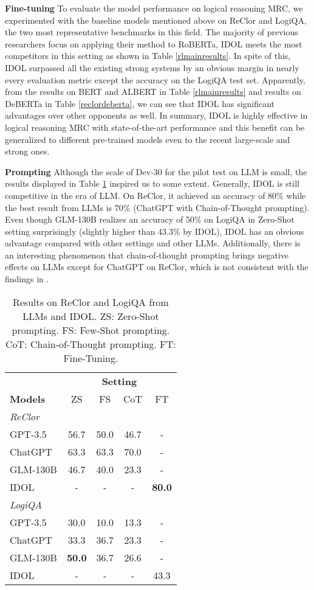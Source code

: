\documentclass[11pt]{article}
\begin{document}
\textbf{Fine-tuning} To evaluate the model performance on logical reasoning MRC, we experimented with the baseline models mentioned above on ReClor and LogiQA, the two most representative benchmarks in this field. The majority of previous researchers focus on applying their method to RoBERTa, IDOL meets the most competitors in this setting as shown in Table \ref{rlmainresults}. In spite of this, IDOL surpassed all the existing strong systems by an obvious margin in nearly every evaluation metric except the accuracy on the LogiQA test set. Apparently, from the results on BERT and ALBERT in Table \ref{rlmainresults} and results on DeBERTa in Table \ref{reclordeberta}, we can see that IDOL has significant advantages over other opponents as well. In summary, IDOL is highly effective in logical reasoning MRC with state-of-the-art performance and this benefit can be generalized to different pre-trained models even to the recent large-scale and strong ones.

\textbf{Prompting} Although the scale of Dev-30 for the pilot test on LLM is small, the results displayed in Table \ref{llmresults} inspired us to some extent. Generally, IDOL is still competitive in the era of LLM. On ReClor, it achieved an accuracy of 80\% while the best result from LLMs is 70\% (ChatGPT with Chain-of-Thought prompting). Even though GLM-130B realizes an accuracy of 50\% on LogiQA in Zero-Shot setting surprisingly (slightly higher than 43.3\% by IDOL), IDOL has an obvious advantage compared with other settings and other LLMs. Additionally, there is an interesting phenomenon that chain-of-thought prompting brings negative effects on LLMs except for ChatGPT on ReClor, which is not consistent with the findings in \citet{cot}.


\begin{table}[t]
\centering
\begin{tabular}{lcccc}
\toprule
 & \multicolumn{4}{c}{\textbf{Setting}} \\
\textbf{Models} & ZS & FS & CoT & FT \\ \midrule

\small\textit{{ReClor}} & & & & \\ 
GPT-3.5 & 56.7 & 50.0 & 46.7 & - \\
ChatGPT  & 63.3 & 63.3 & 70.0 & - \\
GLM-130B & 46.7 & 40.0 & 23.3 & - \\
IDOL & - & - & - & \textbf{80.0} \\  \midrule 

\small\textit{{LogiQA}} & & & & \\ 
GPT-3.5 & 30.0 & 10.0 & 13.3 & - \\
ChatGPT & 33.3 & 36.7 & 23.3 & - \\
GLM-130B & \textbf{50.0} & 36.7 & 26.6 & - \\
IDOL & - & - & - & 43.3 \\ 

\bottomrule
\end{tabular}
\caption{\label{llmresults}Results on ReClor and LogiQA from LLMs and IDOL. ZS: Zero-Shot prompting. FS: Few-Shot prompting. CoT: Chain-of-Thought prompting. FT: Fine-Tuning.} 
\end{table}
\end{document}
